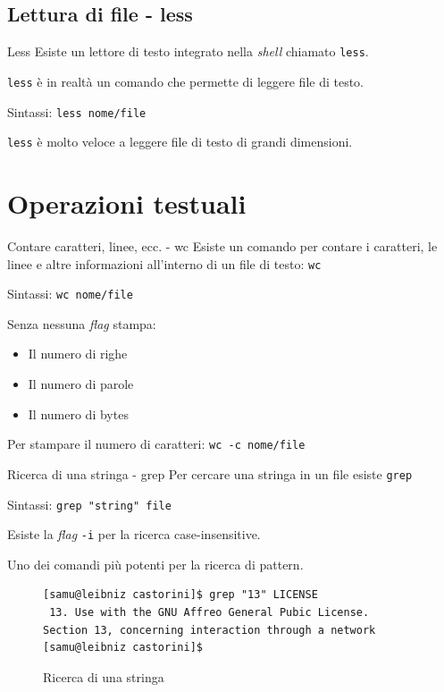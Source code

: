 \documentclass{beamer}
\begin{document}
\subsection{Lettura di file - less}
\begin{frame}{Less}
  Esiste un lettore di testo integrato nella \textit{shell} chiamato 
  \texttt{less}.\bigskip

  \texttt{less} è in realtà un comando che permette di leggere file di 
  testo.\bigskip

  Sintassi: \texttt{less nome/file}\bigskip

  \texttt{less} è molto veloce a leggere file di testo di grandi dimensioni.
\end{frame}

\section{Operazioni testuali}
\begin{frame}{Contare caratteri, linee, ecc. - wc}
  Esiste un comando per contare i caratteri, le linee e altre informazioni
  all'interno di un file di testo: \texttt{wc}\bigskip

  Sintassi: \texttt{wc nome/file}\bigskip

  Senza nessuna \textit{flag} stampa:
  \begin{itemize}
    \item Il numero di righe
    \item Il numero di parole
    \item Il numero di bytes
  \end{itemize}
  Per stampare il numero di caratteri: \texttt{wc -c nome/file}
\end{frame}

\begin{frame}[fragile]{Ricerca di una stringa - grep}
  Per cercare una stringa in un file esiste \texttt{grep}\bigskip

  Sintassi: \texttt{grep "string" file}\bigskip

  Esiste la \textit{flag} \texttt{-i} per la ricerca case-insensitive.\bigskip

  Uno dei comandi più potenti per la ricerca di pattern.
  \begin{figure}
    \begin{lstlisting}[basicstyle=\footnotesize]
[samu@leibniz castorini]$ grep "13" LICENSE
 13. Use with the GNU Affreo General Pubic License.
Section 13, concerning interaction through a network
[samu@leibniz castorini]$
    \end{lstlisting}
    \caption{Ricerca di una stringa}
  \end{figure}
\end{frame}
\end{document}
